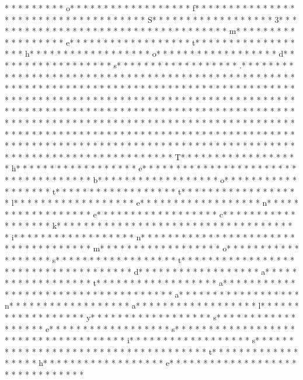  *  * * *  *  * * *  * o* * *  * * *  * * *  *  * * *  *  * * *  * f* * *  * * *  * * *  *  * * *  *  * * *  *  * * *  * * *  * * *  *  * * *  *  * * *  * S* * *  * * *  * * *  *  * * *  *  * * *  * 3* * *  * * *  * * *  *  * * *  *  * * *  *  * * *  * * *  * * *  *  * * *  *  * * *  * m* * *  * * *  * * *  *  * * *  *  * * *  * e* * *  * * *  * * *  *  * * *  *  * * *  * t* * *  * * *  * * *  *  * * *  *  * * *  * h* * *  * * *  * * *  *  * * *  *  * * *  * o* * *  * * *  * * *  *  * * *  *  * * *  * d* * *  * * *  * * *  *  * * *  *  * * *  * s* * *  * * *  * * *  *  * * *  *  * * *  * .* * *  * * *  * * *  *  * * *  *  * * *  *  * * *  * * *  * * *  *  * * *  *  * * *  * 
* * *  * * *  * * *  *  * * *  *  * * *  * 	* * *  * * *  * * *  *  * * *  *  * * *  * 	* * *  * * *  * * *  *  * * *  *  * * *  * 	* * *  * * *  * * *  *  * * *  *  * * *  * 
* * *  * * *  * * *  *  * * *  *  * * *  * 	* * *  * * *  * * *  *  * * *  *  * * *  * 	* * *  * * *  * * *  *  * * *  *  * * *  * 	* * *  * * *  * * *  *  * * *  *  * * *  * * *  * * *  *  * * *  *  * * *  * * *  * * *  *  * * *  *  * * *  *  * * *  * * *  * * *  *  * * *  *  * * *  *  * * *  * * *  * * *  *  * * *  *  * * *  *  * * *  * * *  * * *  *  * * *  *  * * *  *  * * *  * * *  * * *  *  * * *  *  * * *  *  * * *  * * *  * * *  *  * * *  *  * * *  *  * * *  * * *  * * *  *  * * *  *  * * *  *  * * *  * * *  * * *  *  * * *  *  * * *  * T* * *  * * *  * * *  *  * * *  *  * * *  * h* * *  * * *  * * *  *  * * *  *  * * *  * e* * *  * * *  * * *  *  * * *  *  * * *  *  * * *  * * *  * * *  *  * * *  *  * * *  * b* * *  * * *  * * *  *  * * *  *  * * *  * o* * *  * * *  * * *  *  * * *  *  * * *  * t* * *  * * *  * * *  *  * * *  *  * * *  * t* * *  * * *  * * *  *  * * *  *  * * *  * l* * *  * * *  * * *  *  * * *  *  * * *  * e* * *  * * *  * * *  *  * * *  *  * * *  * n* * *  * * *  * * *  *  * * *  *  * * *  * e* * *  * * *  * * *  *  * * *  *  * * *  * c* * *  * * *  * * *  *  * * *  *  * * *  * k* * *  * * *  * * *  *  * * *  *  * * *  *  * * *  * * *  * * *  *  * * *  *  * * *  * i* * *  * * *  * * *  *  * * *  *  * * *  * n* * *  * * *  * * *  *  * * *  *  * * *  *  * * *  * * *  * * *  *  * * *  *  * * *  * m* * *  * * *  * * *  *  * * *  *  * * *  * o* * *  * * *  * * *  *  * * *  *  * * *  * s* * *  * * *  * * *  *  * * *  *  * * *  * t* * *  * * *  * * *  *  * * *  *  * * *  *  * * *  * * *  * * *  *  * * *  *  * * *  * d* * *  * * *  * * *  *  * * *  *  * * *  * a* * *  * * *  * * *  *  * * *  *  * * *  * t* * *  * * *  * * *  *  * * *  *  * * *  * a* * *  * * *  * * *  *  * * *  *  * * *  *  * * *  * * *  * * *  *  * * *  *  * * *  * a* * *  * * *  * * *  *  * * *  *  * * *  * n* * *  * * *  * * *  *  * * *  *  * * *  * a* * *  * * *  * * *  *  * * *  *  * * *  * l* * *  * * *  * * *  *  * * *  *  * * *  * y* * *  * * *  * * *  *  * * *  *  * * *  * s* * *  * * *  * * *  *  * * *  *  * * *  * e* * *  * * *  * * *  *  * * *  *  * * *  * s* * *  * * *  * * *  *  * * *  *  * * *  *  * * *  * * *  * * *  *  * * *  *  * * *  * i* * *  * * *  * * *  *  * * *  *  * * *  * s* * *  * * *  * * *  *  * * *  *  * * *  *  * * *  * * *  * * *  *  * * *  *  * * *  * t* * *  * * *  * * *  *  * * *  *  * * *  * h* * *  * * *  * * *  *  * * *  *  * * *  * e* * *  * * *  * * *  *  * * *  *  * * *  *  * * *  * * *  * * *  *  * * *  